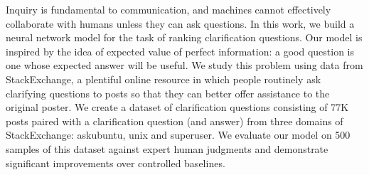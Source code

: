 Inquiry is fundamental to communication, and machines cannot effectively collaborate with humans unless they can ask questions. In this work, we build a neural network model for the task of ranking clarification questions. Our model is inspired by the idea of expected value of perfect information: a good question is one whose expected answer will be useful. We study this problem using data from StackExchange, a plentiful online resource in which people routinely ask clarifying questions to posts so that they can better offer assistance to the original poster. We create a dataset of clarification questions consisting of 77K posts paired with a clarification question (and answer) from three domains of StackExchange: askubuntu, unix and superuser. We evaluate our model on 500 samples of this dataset against expert human judgments and demonstrate significant improvements over controlled baselines.
